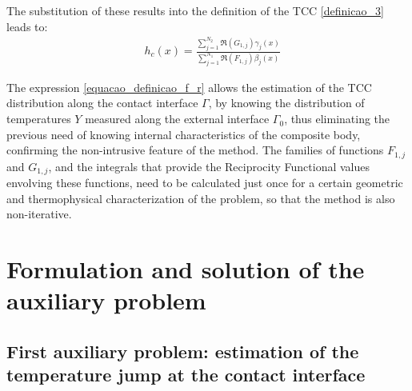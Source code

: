 \documentclass[12pt]{CHT-20}
\begin{document}
The substitution of these results into the definition of the TCC \eqref{definicao_3} leads to:
\begin{align}
& h_c(x) %
= \frac{\displaystyle\sum_{j=1}^{N_2} \Re(G_{1,j}) \gamma_j(x)}{\displaystyle\sum_{j=1}^{N_1} \Re(F_{1,j}) \beta_j(x)}
\label{equacao_definicao_f_r}
\end{align}

The expression \eqref{equacao_definicao_f_r} allows the estimation of the TCC distribution along the contact interface $\Gamma$, by knowing the distribution of temperatures $Y$ measured along the external interface $\Gamma_0$, thus eliminating the previous need of knowing internal characteristics of the composite body, confirming the non-intrusive feature of the method. The families of functions $F_{1, j}$ and $G_{1, j}$, and the integrals that provide the Reciprocity Functional values envolving these functions, need to be calculated just once for a certain geometric and thermophysical characterization of the problem, so that the method is also non-iterative.

\section*{Formulation and solution of the auxiliary problem}
\subsection*{First auxiliary problem: estimation of the temperature jump at the contact interface}
\end{document}
